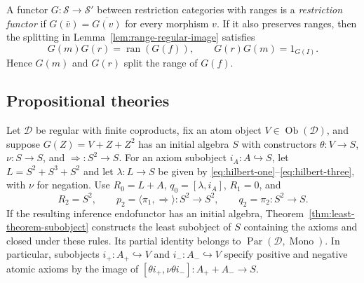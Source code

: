 \documentclass[11pt]{article}
\theoremstyle{definition}\newtheorem{definition}[theorem]{Definition}
\newcommand{\ran}{\operatorname{ran}}
\newcommand{\Par}{\operatorname{Par}}
\newcommand{\Mono}{\operatorname{Mono}}
\begin{document}
A functor $G:\mathcal S\to\mathcal S'$ between restriction categories
with ranges is a \emph{restriction functor} if
$G(\bar v)=\overline{G(v)}$ for every morphism $v$.
If it also preserves ranges, then the splitting in
Lemma~\ref{lem:range-regular-image} satisfies
\[
 G(m)G(r)=\ran(G(f)),\qquad G(r)G(m)=1_{G(I)}.
\]
Hence $G(m)$ and $G(r)$ split the range of $G(f)$.

\subsection{Propositional theories}
\label{app:propositional-theories}

Let $\mathcal D$ be regular with finite coproducts, fix an atom
object $V\in\operatorname{Ob}(\mathcal D)$, and suppose
$G(Z)=V+Z+Z^2$ has an initial algebra
$S$ with constructors $\theta:V\to S$, $\nu:S\to S$, and
${\Rightarrow}:S^2\to S$. For an axiom subobject
$i_A:A\hookrightarrow S$, let $L=S^2+S^3+S^2$ and let
$\lambda:L\to S$ be given by
\eqref{eq:hilbert-one}--\eqref{eq:hilbert-three}, with $\nu$ for
negation. Use $R_0=L+A$, $q_0=[\lambda,i_A]$, $R_1=0$, and
\[
 R_2=S^2,\qquad
 p_2=\langle\pi_1,\Rightarrow\rangle:S^2\to S^2,
 \qquad q_2=\pi_2:S^2\to S.
\]
If the resulting inference endofunctor has an initial algebra,
Theorem~\ref{thm:least-theorem-subobject} constructs the least
subobject of $S$ containing the axioms and closed under these rules.
Its partial identity belongs to $\Par(\mathcal D,\Mono)$.
In particular, subobjects $i_+:A_+\hookrightarrow V$ and
$i_-:A_-\hookrightarrow V$ specify positive and negative atomic
axioms by the image of
$[\theta i_+,\nu\theta i_-]:A_++A_-\to S$.
\end{document}
